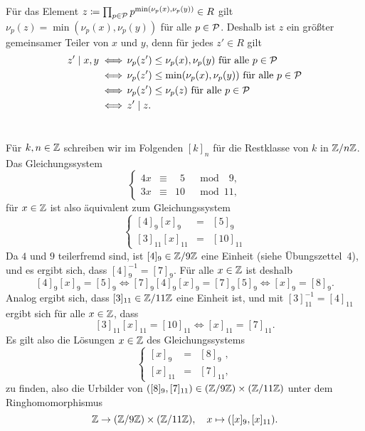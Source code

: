 \documentclass[a4paper,10pt,numbers=noenddot]{scrartcl}
\begin{document}
Für das Element $z \coloneqq \prod_{p \in \mathcal{P}} p^{\min(\nu_p(x), \nu_p(y))} \in R$ gilt $\nu_p(z) = \min( \nu_p(x), \nu_p(y) )$ für alle $p \in \mathcal{P}$.
Deshalb ist $z$ ein größter gemeinsamer Teiler von $x$ und $y$, denn für jedes $z' \in R$ gilt
\begin{align*}
          z' \mid x,y
  \iff&\, \text{$\nu_p(z') \leq \nu_p(x), \nu_p(y)$ für alle $p \in \mathcal{P}$}
  \\
  \iff&\, \text{$\nu_p(z') \leq \min(\nu_p(x), \nu_p(y))$ für alle $p \in \mathcal{P}$}
  \\
  \iff&\, \text{$\nu_p(z') \leq \nu_p(z)$ für alle $p \in \mathcal{P}$}
  \\
  \iff&\, z' \mid z.
\end{align*}





\section{}

Für $k, n \in \mathbb{Z}$ schreiben wir im Folgenden $[k]_n$ für die Restklasse von $k$ in $\mathbb{Z}/n\mathbb{Z}$.
Das Gleichungssystem
\[
  \left\{
    \begin{matrix}
      4x  & \equiv  & \phantom{1}5  & \mod \phantom{1}9,
    \\
      3x  & \equiv  &           10  & \mod           11,
    \end{matrix}
  \right.
\]
für $x \in \mathbb{Z}$ ist also äquivalent zum Gleichungssystem
\[
  \left\{
    \begin{matrix}
      [4]_9 [x]_9       & = & [5]_9
    \\
      [3]_{11} [x]_{11} & = & [10]_{11}
    \end{matrix}
  \right.
\]
Da $4$ und $9$ teilerfremd sind, ist $[4]_9 \in \mathbb{Z}/9\mathbb{Z}$ eine Einheit (siehe Übungszettel~4), und es ergibt sich, dass $[4]_9^{-1} = [7]_9$.
Für alle $x \in \mathbb{Z}$ ist deshalb
\[
        [4]_9 [x]_9       = [5]_9
  \iff  [7]_9 [4]_9 [x]_9 = [7]_9 [5]_9
  \iff  [x]_9             = [8]_9.
\]
Analog ergibt sich, dass $[3]_{11} \in \mathbb{Z}/11\mathbb{Z}$ eine Einheit ist, und mit $[3]_{11}^{-1} = [4]_{11}$ ergibt sich für alle $x \in \mathbb{Z}$, dass
\[
        [3]_{11} [x]_{11} = [10]_{11}
  \iff  [x]_{11}          =  [7]_{11}.
\]
Es gilt also die Lösungen $x \in \mathbb{Z}$ des Gleichungssystems
\[
  \left\{
    \begin{matrix}
      [x]_{9\phantom{1}}  & = & [8]_{9\phantom{1}},
    \\
      [x]_{11}            & = & [7]_{11},
    \end{matrix}
  \right.
\]
zu finden, also die Urbilder von $([8]_9, [7]_{11}) \in (\mathbb{Z}/9\mathbb{Z}) \times (\mathbb{Z}/11\mathbb{Z})$ unter dem Ringhomomorphismus
\[
  \mathbb{Z} \to (\mathbb{Z}/9\mathbb{Z}) \times (\mathbb{Z}/11\mathbb{Z}),
  \quad
  x \mapsto ([x]_9, [x]_{11}).
\]
\end{document}
